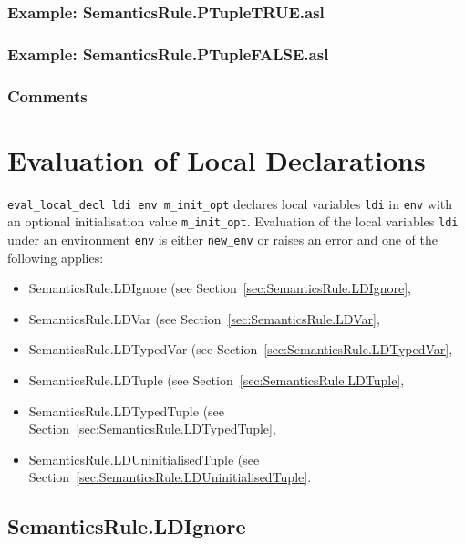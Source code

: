 \documentclass{book}
\begin{document}
    \subsection{Example: SemanticsRule.PTupleTRUE.asl}

    \subsection{Example: SemanticsRule.PTupleFALSE.asl}

    \subsection{Comments}

\chapter{Evaluation of Local Declarations \label{chap:eval_local_decl}}

\texttt{eval\_local\_decl ldi env m\_init\_opt} declares local variables
\texttt{ldi} in \texttt{env} with an optional initialisation value
\texttt{m\_init\_opt}.  Evaluation of the local variables \texttt{ldi}
under an environment \texttt{env} is either \texttt{new\_env} or raises an
error and one of the following applies:
\begin{itemize}
\item SemanticsRule.LDIgnore (see Section~\ref{sec:SemanticsRule.LDIgnore},
\item SemanticsRule.LDVar (see Section~\ref{sec:SemanticsRule.LDVar},
\item SemanticsRule.LDTypedVar (see Section~\ref{sec:SemanticsRule.LDTypedVar},
\item SemanticsRule.LDTuple (see Section~\ref{sec:SemanticsRule.LDTuple},
\item SemanticsRule.LDTypedTuple (see Section~\ref{sec:SemanticsRule.LDTypedTuple},
\item SemanticsRule.LDUninitialisedTuple (see Section~\ref{sec:SemanticsRule.LDUninitialisedTuple}.
\end{itemize}

\section{SemanticsRule.LDIgnore \label{sec:SemanticsRule.LDIgnore}}
\end{document}
